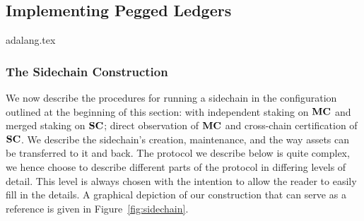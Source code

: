 \subsection{Implementing Pegged Ledgers}
\label{sec:construction}




{adalang.tex}

\subsubsection{The Sidechain Construction}
\label{sec:const}

We now describe the procedures for running a sidechain in the configuration
outlined at the beginning of this section: with independent staking on $\mathbf{MC}$ and
merged staking on $\mathbf{SC}$; direct observation of $\mathbf{MC}$ and
cross-chain certification of $\mathbf{SC}$.
We describe the sidechain's creation,
maintenance, and the way assets can be  transferred to it and back.  The
protocol we describe below is quite complex,
we hence choose to describe different parts of the protocol in
differing levels of detail. This level is always chosen with the intention to allow the
reader to easily fill in the details.
A graphical depiction of our construction that can serve as a reference
is given in Figure~\ref{fig:sidechain}.
